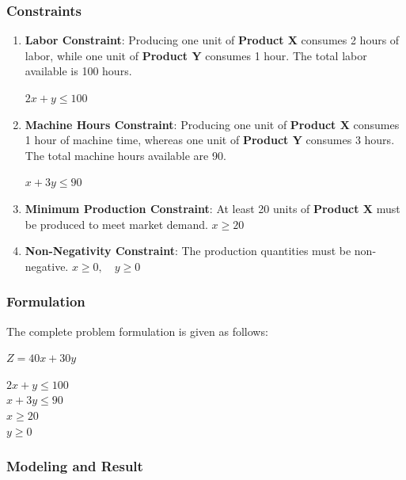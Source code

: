 \subsubsection{Constraints}
\begin{enumerate}
    \item \textbf{Labor Constraint}: Producing one unit of \textbf{Product X} consumes 2 hours of labor, while one unit of \textbf{Product Y} consumes 1 hour. The total labor available is 100 hours.

    $
    2x + y \leq 100
    $
    
    \item \textbf{Machine Hours Constraint}: Producing one unit of \textbf{Product X} consumes 1 hour of machine time, whereas one unit of \textbf{Product Y} consumes 3 hours. The total machine hours available  are 90.

    $
    x + 3y \leq 90
    $
    
    \item \textbf{Minimum Production Constraint}: At least 20 units of \textbf{Product X} must be produced to meet market demand.
    $
    x \geq 20
    $
    
    \item \textbf{Non-Negativity Constraint}: The production quantities must be non-negative.
    $
    x \geq 0, \quad y \geq 0
    $
\end{enumerate}

\subsubsection{Formulation}
The complete problem formulation is given as follows:

\begin{center}
    $  Z = 40x + 30y $ 
\end{center}
\begin{center}
    $ 2x + y \leq 100 $ \\
    $ x + 3y \leq 90 $ \\
    $ x \geq 20 $ \\
    $ y \geq 0 \quad $
\end{center}

\newpage
\subsubsection{Modeling and Result}

